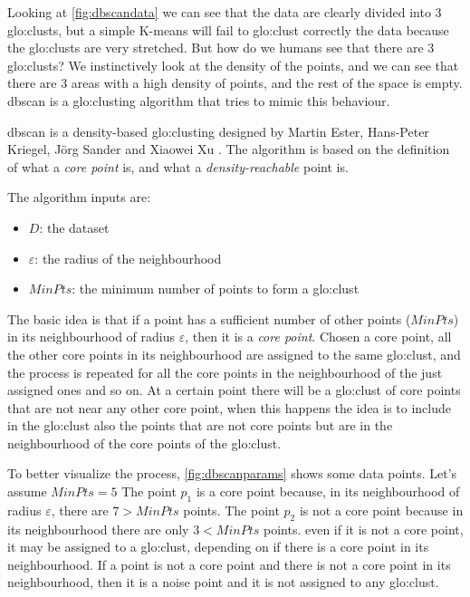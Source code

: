 Looking at \autoref{fig:dbscandata} we can see that the data are clearly divided into $3$ \gls{glo:clust}s, but a simple K-means will fail to \gls{glo:clust} correctly the data because the \gls{glo:clust}s are very stretched. 
But how do we humans see that there are $3$ \gls{glo:clust}s? We instinctively look at the density of the points, and we can see that there are $3$ areas with a high density of points, and the rest of the space is empty. \gls{dbscan} is a \gls{glo:clust}ing algorithm that tries to mimic this behaviour.

\gls{dbscan} is a density-based \gls{glo:clust}ing designed by Martin Ester, Hans-Peter Kriegel, Jörg Sander and Xiaowei Xu \cite{dbscan}. The algorithm is based on the definition of what a  \emph{core point} is, and what a \emph{density-reachable} point is.


The algorithm inputs are:
\begin{itemize}
    \item $D$: the dataset
    \item $\varepsilon$: the radius of the neighbourhood
    \item $MinPts$: the minimum number of points to form a \gls{glo:clust}
\end{itemize}

The basic idea is that if a point has a sufficient number of other points ($MinPts$) in its neighbourhood of radius $\varepsilon$, then it is a \emph{core point}. Chosen a core point, all the other core points in its neighbourhood are assigned to the same \gls{glo:clust}, and the process is repeated for all the core points in the neighbourhood of the just assigned ones and so on. At a certain point there will be a \gls{glo:clust} of core points that are not near any other core point, when this happens the idea is to include in the \gls{glo:clust} also the points that are not core points but are in the neighbourhood of the core points of the \gls{glo:clust}. 

To better visualize the process, \autoref{fig:dbscanparams} shows some data points. Let's assume $MinPts = 5$ The point $p_1$ is a core point because, in its neighbourhood of radius $\varepsilon$, there are $7>MinPts$ points. The point $p_2$ is not a core point because in its neighbourhood there are only $3<MinPts$ points. even if it is not a core point, it may be assigned to a \gls{glo:clust}, depending on if there is a core point in its neighbourhood. If a point is not a core point and there is not a core point in its neighbourhood, then it is a noise point and it is not assigned to any \gls{glo:clust}. 


